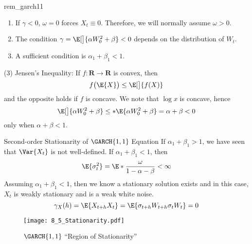 \begin{Remark}{}{rem_garch11}
    \begin{enumerate}[(1)]
        \item If $ \gamma<0 $, $ \omega=0 $ forces $ X_t\equiv 0 $. Therefore, we will
              normally assume $ \omega>0 $.
        \item The condition $ \gamma=\E[\big]{\log{\alpha W_0^2+\beta}}<0 $ depends
              on the distribution of $ W_t $.
        \item A sufficient condition is $ \alpha_1+\beta_1<1 $.
    \end{enumerate}
\end{Remark}
\begin{Proof}{ (3)}{}
    Jensen's Inequality: If $ f:\mathbf{R}\to\mathbf{R} $ is convex, then
    \[ f\bigl(\E{X}\bigr)\le \E[\big]{f(X)} \]
    and the opposite holds if $ f $ is concave. We note that $ \log{x} $
    is concave, hence
    \[ \E[\big]{\log{\alpha W_0^2+\beta}}\le \log*{\E{\alpha W_0^2+\beta}}=\log{\alpha+\beta}<0 \]
    only when $ \alpha+\beta<1 $.
\end{Proof}
\begin{Remark}{Second-order Stationarity of $ \GARCH{1,1} $ Equation}{}
    If $ \alpha_1+\beta_1>1 $, we have seen that $ \Var{X_t} $ is not well-defined.
    If $ \alpha_1+\beta_1<1 $, then
    \[ \E{\sigma_t^2}=\E*{\frac{\omega}{1-\alpha-\beta}}<\infty \]
    Assuming $ \alpha_1+\beta_1<1 $, then we know a stationary solution exists and
    in this case, $ X_t $ is weakly stationary and is a weak white noise.
    \[ \gamma_X(h)=\E{X_{t+h}X_t}=\E{\sigma_{t+h}W_{t+h}\sigma_t W_t}=0 \]
\end{Remark}
\begin{figure}[!htbp]
    \centering
    \texttt{[image: 8\_5\_Stationarity.pdf]}
    \caption{$ \GARCH{1,1} $ ``Region of Stationarity''}
\end{figure}
